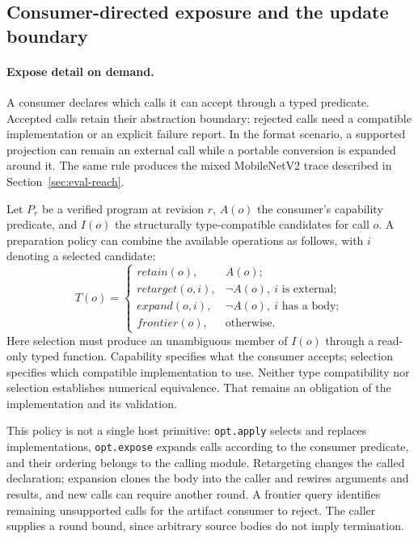 \documentclass[sigplan,anonymous,review]{acmart}
\begin{document}
\subsection{Consumer-directed exposure and the update boundary}
\label{sec:reactive}
\paragraph{Expose detail on demand.}
A consumer declares which calls it can accept through a typed predicate.
Accepted calls retain their abstraction boundary; rejected calls need a
compatible implementation or an explicit failure report. In the format
scenario, a supported projection can remain an external call while a
portable conversion is expanded around it. The same rule produces the mixed
MobileNetV2 trace described in Section~\ref{sec:eval-reach}.

Let $P_r$ be a verified program at revision $r$, $A(o)$ the consumer's
capability predicate, and $I(o)$ the structurally type-compatible candidates
for call $o$. A preparation policy can combine the available operations as
follows, with $i$ denoting a selected candidate:
\[
T(o)=
\begin{cases}
\mathit{retain}(o), & A(o);\\
\mathit{retarget}(o,i), & \neg A(o),\ i\text{ is external};\\
\mathit{expand}(o,i), & \neg A(o),\ i\text{ has a body};\\
\mathit{frontier}(o), & \text{otherwise}.
\end{cases}
\]
Here selection must produce an unambiguous member of $I(o)$ through a
read-only typed function. Capability specifies what the consumer accepts;
selection specifies which compatible implementation to use. Neither type
compatibility nor selection establishes numerical equivalence. That remains
an obligation of the implementation and its validation.

This policy is not a single host primitive: \texttt{opt.apply} selects and
replaces implementations, \texttt{opt.expose} expands calls according to the
consumer predicate, and their ordering belongs to the calling module.
Retargeting changes the called declaration; expansion clones the body into
the caller and rewires arguments and results, and new calls can require
another round. A frontier query identifies remaining unsupported calls for
the artifact consumer to reject. The caller supplies a round bound, since
arbitrary source bodies do not imply termination.
\end{document}
